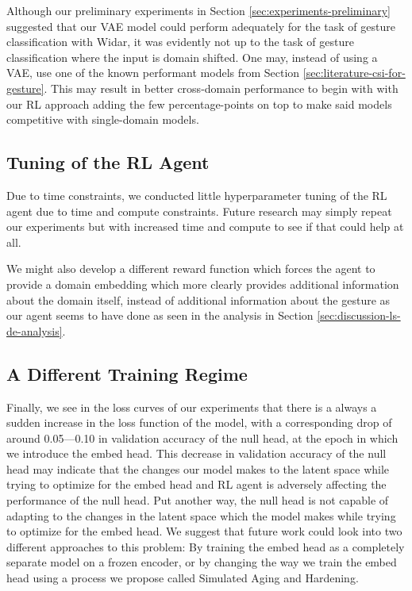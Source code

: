 Although our preliminary experiments in Section \ref{sec:experiments-preliminary} suggested that our VAE model could perform adequately for the task of gesture classification with Widar, it was evidently not up to the task of gesture classification where the input is domain shifted.
One may, instead of using a VAE, use one of the known performant models from Section \ref{sec:literature-csi-for-gesture}.
This may result in better cross-domain performance to begin with with our RL approach adding the few percentage-points on top to make said models competitive with single-domain models.

\subsection{Tuning of the RL Agent}

Due to time constraints, we conducted little hyperparameter tuning of the RL agent due to time and compute constraints. 
Future research may simply repeat our experiments but with increased time and compute to see if that could help at all.

We might also develop a different reward function which forces the agent to provide a domain embedding which more clearly provides additional information about the domain itself, instead of additional information about the gesture as our agent seems to have done as seen in the analysis in Section \ref{sec:discussion-ls-de-analysis}.

\subsection{A Different Training Regime}

Finally, we see in the loss curves of our experiments that there is a always a sudden increase in the loss function of the model, with a corresponding drop of around 0.05—0.10 in validation accuracy of the null head, at the epoch in which we introduce the embed head.
This decrease in validation accuracy of the null head may indicate that the changes our model makes to the latent space while trying to optimize for the embed head and RL agent is adversely affecting the performance of the null head.
Put another way, the null head is not capable of adapting to the changes in the latent space which the model makes while trying to optimize for the embed head.
We suggest that future work could look into two different approaches to this problem: By training the embed head as a completely separate model on a frozen encoder, or by changing the way we train the embed head using a process we propose called Simulated Aging and Hardening.

